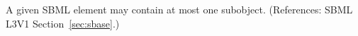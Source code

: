 A given SBML element may contain at most one \Annotation subobject.
(References: SBML L3V1 Section~\ref{sec:sbase}.)


